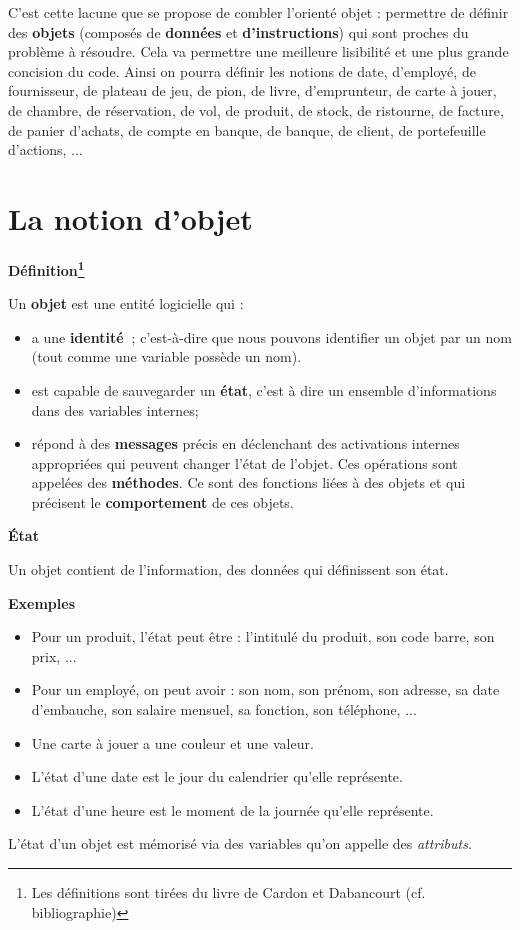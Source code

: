 	{
	C'est cette lacune que se propose de combler
	l'orienté objet : permettre de définir des
	\textbf{objets} (composés de \textbf{données} et
	\textbf{d'instructions}) qui sont proches du problème
	à résoudre. Cela va permettre une meilleure lisibilité et une plus
	grande concision du code. Ainsi on pourra définir les notions de date,
	d'employé, de fournisseur, de plateau de jeu, de pion,
	de livre, d'emprunteur, de carte à jouer, de chambre,
	de réservation, de vol, de produit, de stock, de ristourne, de facture,
	de panier d'achats, de compte en banque, de banque, de
	client, de portefeuille d'actions, ...}

\section{La notion d'objet}
{\sffamily\bfseries\upshape
Définition\footnote{Les définitions sont tirées du livre de Cardon et
Dabancourt (cf. bibliographie)}}

{
Un \textbf{objet} est une entité logicielle qui :}

\liststyleListi
\begin{itemize}
\item {
a une \textbf{identité~}; c'est-à-dire que nous pouvons
identifier un objet par un nom (tout comme une variable possède un
nom).}
\item {
est capable de sauvegarder un \textbf{état}, c'est à
dire un ensemble d'informations dans des variables
internes;}
\item {
répond à des \textbf{messages} précis en déclenchant des activations
internes appropriées qui peuvent changer l'état de
l'objet. Ces opérations sont appelées des
\textbf{méthodes}. Ce sont des fonctions liées à des objets et qui
précisent le \textbf{comportement} de ces objets.}
\end{itemize}
{\sffamily\bfseries\upshape
État}

{
Un objet contient de l'information, des données qui
définissent son état. }

{\bfseries
Exemples}

\liststyleListv
\begin{itemize}
\item {
Pour un produit, l'état peut être :
l'intitulé du produit, son code barre, son prix, ... }
\item {
Pour un employé, on peut avoir : son nom, son prénom, son adresse, sa
date d'embauche, son salaire mensuel, sa fonction, son
téléphone, ... }
\item {
Une carte à jouer a une couleur et une valeur.}
\item {
L'état d'une date est le jour du
calendrier qu'elle représente.}
\item {
L'état d'une heure est le moment de la
journée qu'elle représente.}
\end{itemize}
{
L'état d'un objet est mémorisé via des
variables qu'on appelle des \textit{attributs}.}

